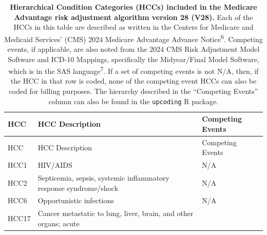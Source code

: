 \documentclass[
  12pt,
  number,
  doubleblind]{elsarticle}
\begin{document}
\begin{longtable}[]{@{}
  >{\raggedright\arraybackslash}p{}
  >{\raggedright\arraybackslash}p{}
  >{\raggedright\arraybackslash}p{}@{}}
\caption{\textbf{Hierarchical Condition Categories (HCCs) included in
the Medicare Advantage risk adjustment algorithm version 28 (V28).} Each
of the HCCs in this table are described as written in the Centers for
Medicare and Medicaid Services' (CMS) 2024 Medicare Advantage Advance
Notice\textsuperscript{6}. Competing events, if applicable, are also
noted from the 2024 CMS Risk Adjustment Model Software and ICD-10
Mappings, specifically the Midyear/Final Model Software, which is in the
SAS language\textsuperscript{7}. If a set of competing events is not
N/A, then, if the HCC in that row is coded, none of the competing event
HCCs can also be coded for billing purposes. The hierarchy described in
the ``Competing Events'' column can also be found in the
\texttt{upcoding} R package.}\label{tbl-v28hccs}\tabularnewline
\toprule\noalign{}
\begin{minipage}[b]{\linewidth}\raggedright
HCC
\end{minipage} & \begin{minipage}[b]{\linewidth}\raggedright
HCC Description
\end{minipage} & \begin{minipage}[b]{\linewidth}\raggedright
Competing Events
\end{minipage} \\
\midrule\noalign{}
\endfirsthead
\toprule\noalign{}
\begin{minipage}[b]{\linewidth}\raggedright
HCC
\end{minipage} & \begin{minipage}[b]{\linewidth}\raggedright
HCC Description
\end{minipage} & \begin{minipage}[b]{\linewidth}\raggedright
Competing Events
\end{minipage} \\
\midrule\noalign{}
\endhead
\bottomrule\noalign{}
\endlastfoot
HCC1 & HIV/AIDS & N/A \\
HCC2 & Septicemia, sepsis, systemic inflammatory response syndrome/shock
& N/A \\
HCC6 & Opportunistic infections & N/A \\
HCC17 & Cancer metastatic to lung, liver, brain, and other organs; acute

\end{longtable}
\end{document}
